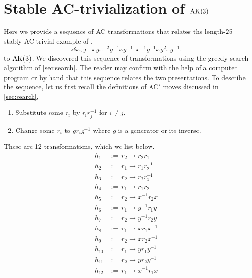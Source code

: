 
\section{Stable AC-trivialization of $\text{AK}(3)$}\label{sec:stable_ak3}

Here we provide a sequence of AC transformations that relates the length-25 stably AC-trivial example of \cite{MMS}, 
\[
\angles{x, y \mid xyx^{-2}y^{-1} xy^{-1}, x^{-1} y^{-1} x y^2 x y^{-1}}.
\]
to $\text{AK}(3)$. We discovered this sequence of transformations using the greedy search algorithm of \autoref{sec:search}. The reader may confirm with the help of a computer program or by hand that this sequence relates the two presentations. To describe the sequence, let us first recall the definitions of AC$'$ moves discussed in \autoref{sec:search},
\begin{enumerate}[label=(AC$'$\arabic*)]
	\item Substitute some $r_i$ by $r_i r_j^{\pm 1}$ for $i \neq j$.
	\item Change some $r_i$ to $g r_i g^{-1}$ where $g$ is a generator or its inverse.
\end{enumerate}

These are 12 transformations, which we list below.
\[
\begin{aligned}
h_1 &:= \  r_2 \rightarrow r_2 r_1 \\
h_2 &:= \ r_1 \rightarrow r_1 r_2^{-1} \\
h_3 &:= \ r_2 \rightarrow r_2 r_1^{-1} \\
h_4 &:= \ r_1 \rightarrow r_1 r_2 \\
h_5 &:= \ r_2 \rightarrow x^{-1} r_2 x \\
h_6 &:= \ r_1 \rightarrow y^{-1} r_1 y \\
h_7 &:= \ r_2 \rightarrow y^{-1} r_2 y \\
h_8 &:= \ r_1 \rightarrow x r_1 x^{-1} \\
h_9 &:= \ r_2 \rightarrow x r_2 x^{-1} \\
h_{10} &:= \ r_1 \rightarrow y r_1 y^{-1} \\
h_{11} &:= \ r_2 \rightarrow y r_2 y^{-1} \\
h_{12} &:= \ r_1 \rightarrow x^{-1} r_1 x 
\end{aligned}
\]

